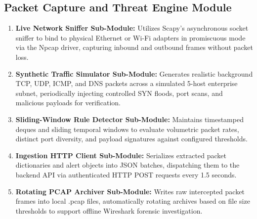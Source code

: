 \documentclass[a4paper,12pt]{report}
\begin{document}
	\subsection{Packet Capture and Threat Engine Module}
	\begin{enumerate}
		\item \textbf{Live Network Sniffer Sub-Module:} Utilizes Scapy's asynchronous socket sniffer to bind to physical Ethernet or Wi-Fi adapters in promiscuous mode via the Npcap driver, capturing inbound and outbound frames without packet loss.
		\item \textbf{Synthetic Traffic Simulator Sub-Module:} Generates realistic background TCP, UDP, ICMP, and DNS packets across a simulated 5-host enterprise subnet, periodically injecting controlled SYN floods, port scans, and malicious payloads for verification.
		\item \textbf{Sliding-Window Rule Detector Sub-Module:} Maintains timestamped deques and sliding temporal windows to evaluate volumetric packet rates, distinct port diversity, and payload signatures against configured thresholds.
		\item \textbf{Ingestion HTTP Client Sub-Module:} Serializes extracted packet dictionaries and alert objects into JSON batches, dispatching them to the backend API via authenticated HTTP POST requests every 1.5 seconds.
		\item \textbf{Rotating PCAP Archiver Sub-Module:} Writes raw intercepted packet frames into local .pcap files, automatically rotating archives based on file size thresholds to support offline Wireshark forensic investigation.
	\end{enumerate}
	
\end{document}
